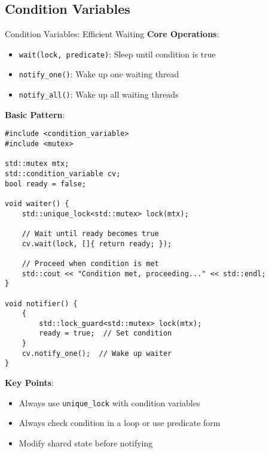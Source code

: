 \subsection{Condition Variables}
\begin{frame}[fragile]{ Condition Variables: Efficient Waiting}
	\textbf{Core Operations}:
	\begin{itemize}
		\item \texttt{wait(lock, predicate)}: Sleep until condition is true
		\item \texttt{notify\_one()}: Wake up one waiting thread
		\item \texttt{notify\_all()}: Wake up all waiting threads
	\end{itemize}

	\vspace{0.5em}
	\textbf{Basic Pattern}:
	\begin{verbatim}
#include <condition_variable>
#include <mutex>

std::mutex mtx;
std::condition_variable cv;
bool ready = false;

void waiter() {
    std::unique_lock<std::mutex> lock(mtx);

    // Wait until ready becomes true
    cv.wait(lock, []{ return ready; });

    // Proceed when condition is met
    std::cout << "Condition met, proceeding..." << std::endl;
}

void notifier() {
    {
        std::lock_guard<std::mutex> lock(mtx);
        ready = true;  // Set condition
    }
    cv.notify_one();  // Wake up waiter
}
	\end{verbatim}

	 \textbf{Key Points}:
	\begin{itemize}
		\item Always use \texttt{unique\_lock} with condition variables
		\item Always check condition in a loop or use predicate form
		\item Modify shared state before notifying
	\end{itemize}
\end{frame}

